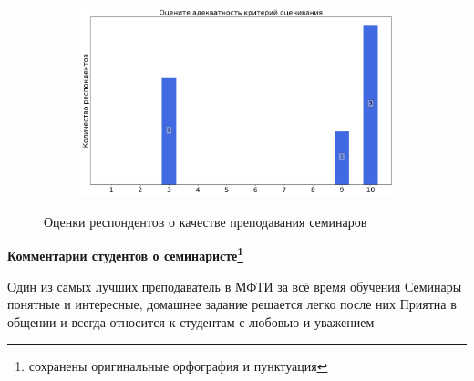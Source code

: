 \begin{figure}[H]
\begin{subfigure}[b]{0.45\textwidth}
			\end{subfigure}
			\begin{subfigure}[b]{0.45\textwidth}
				\centering
				\includegraphics[width=\textwidth]{images/2 course/Аналитическая механика/seminarists-marks-Монахова У.В.-3.png}
			\end{subfigure}	
			\caption{Оценки респондентов о качестве преподавания семинаров}
		\end{figure}

		\textbf{Комментарии студентов о семинаристе\protect\footnote{сохранены оригинальные орфография и пунктуация}}
            \begin{commentbox} 
                Один из самых лучших преподаватель в МФТИ за всё время обучения
                Семинары понятные и интересные, домашнее задание решается легко после них
                Приятна в общении и всегда относится к студентам с любовью и уважением 
            \end{commentbox}


